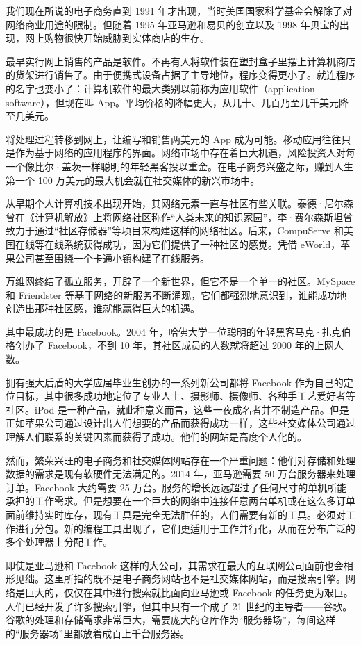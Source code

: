 \documentclass[12pt,UTF8]{ctexbook}
\begin{document}
我们现在所说的电子商务直到 1991 年才出现，当时美国国家科学基金会解除了对网络商业用途的限制。但随着 1995 年亚马逊和易贝的创立以及 1998 年贝宝的出现，网上购物很快开始威胁到实体商店的生存。

最早实行网上销售的产品是软件。不再有人将软件装在塑封盒子里摆上计算机商店的货架进行销售了。由于便携式设备占据了主导地位，程序变得更小了。就连程序的名字也变小了：计算机软件的最大类别以前称为应用软件（application software），但现在叫 App。平均价格的降幅更大，从几十、几百乃至几千美元降至几美元。

将处理过程转移到网上，让编写和销售两美元的 App 成为可能。移动应用往往只是作为基于网络的应用程序的界面。网络市场中存在着巨大机遇，风险投资人对每一个像比尔·盖茨一样聪明的年轻黑客投以重金。在电子商务兴盛之际，赚到人生第一个 100 万美元的最大机会就在社交媒体的新兴市场中。

从早期个人计算机技术出现开始，其网络元素一直与社区有些关联。泰德·尼尔森曾在《计算机解放》上将网络社区称作“人类未来的知识家园”，李·费尔森斯坦曾致力于通过“社区存储器”等项目来构建这样的网络社区。后来，CompuServe 和美国在线等在线系统获得成功，因为它们提供了一种社区的感觉。凭借 eWorld，苹果公司甚至围绕一个卡通小镇构建了在线服务。

万维网终结了孤立服务，开辟了一个新世界，但它不是一个单一的社区。MySpace 和 Friendster 等基于网络的新服务不断涌现，它们都强烈地意识到，谁能成功地创造出那种社区感，谁就能赢得巨大的机遇。

其中最成功的是 Facebook。2004 年，哈佛大学一位聪明的年轻黑客马克·扎克伯格创办了 Facebook，不到 10 年，其社区成员的人数就将超过 2000 年的上网人数。

拥有强大后盾的大学应届毕业生创办的一系列新公司都将 Facebook 作为自己的定位目标，其中很多成功地定位了专业人士、摄影师、摄像师、各种手工艺爱好者等社区。iPod 是一种产品，就此种意义而言，这些一夜成名者并不制造产品。但是正如苹果公司通过设计出人们想要的产品而获得成功一样，这些社交媒体公司通过理解人们联系的关键因素而获得了成功。他们的网站是高度个人化的。

然而，繁荣兴旺的电子商务和社交媒体网站存在一个严重问题：他们对存储和处理数据的需求是现有软硬件无法满足的。2014 年，亚马逊需要 50 万台服务器来处理订单。Facebook 大约需要 25 万台。服务的增长远远超过了任何尺寸的单机所能承担的工作需求。但是想要在一个巨大的网络中连接任意两台单机或在这么多订单面前维持实时库存，现有工具是完全无法胜任的，人们需要有新的工具。必须对工作进行分包。新的编程工具出现了，它们更适用于工作并行化，从而在分布广泛的多个处理器上分配工作。

即使是亚马逊和 Facebook 这样的大公司，其需求在最大的互联网公司面前也会相形见绌。这里所指的既不是电子商务网站也不是社交媒体网站，而是搜索引擎。网络是巨大的，仅仅在其中进行搜索就比面向亚马逊或 Facebook 的任务更为艰巨。人们已经开发了许多搜索引擎，但其中只有一个成了 21 世纪的主导者——谷歌。谷歌的处理和存储需求非常巨大，需要庞大的仓库作为“服务器场”，每间这样的“服务器场”里都放着成百上千台服务器。
\end{document}
